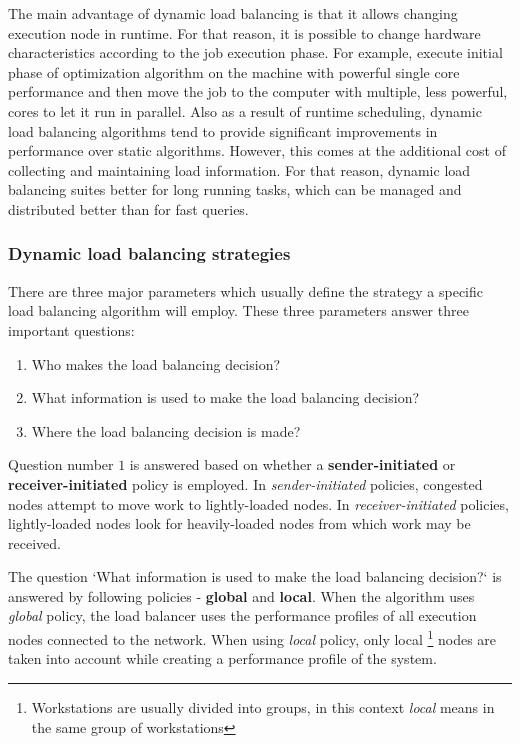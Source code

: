 The main advantage of dynamic load balancing is that it allows changing execution node in runtime.
For that reason, it is possible to change hardware characteristics according to the job execution phase.
For example, execute initial phase of optimization algorithm on the machine with powerful single core performance
and then move the job to the computer with multiple, less powerful, cores to let it run in parallel.
Also as a result of runtime scheduling,
dynamic load balancing algorithms tend to provide significant improvements in performance over static algorithms.
However, this comes at the additional cost of collecting and maintaining load information\cite{malik2000dynamic}.
For that reason, dynamic load balancing suites better for long running tasks, which can be managed and distributed better than for fast queries.

\subsubsection{Dynamic load balancing strategies}
There are three major parameters which usually define the strategy a specific load balancing algorithm will employ.
These three parameters answer three important questions\cite{malik2000dynamic}:
\begin{enumerate}
    \item Who makes the load balancing decision?
    \item What information is used to make the load balancing decision?
    \item Where the load balancing decision is made?
\end{enumerate}

Question number $1$ is answered based on whether a \textbf{sender-initiated} or \textbf{receiver-initiated} policy is employed.
In \textit{sender-initiated} policies, congested nodes attempt to move work to lightly-loaded nodes.
In \textit{receiver-initiated} policies, lightly-loaded nodes look for heavily-loaded nodes from which work may be received\cite{malik2000dynamic}.

\smallskip
The question `What information is used to make the load balancing decision?` is answered by following policies - \textbf{global} and \textbf{local}.
When the algorithm uses \textit{global} policy, the load balancer uses the performance profiles of all execution nodes connected to the network.
When using \textit{local} policy, only local
\footnote{Workstations are usually divided into groups, in this context \textit{local} means in the same group of workstations}
nodes are taken into account while creating a performance profile of the system.

